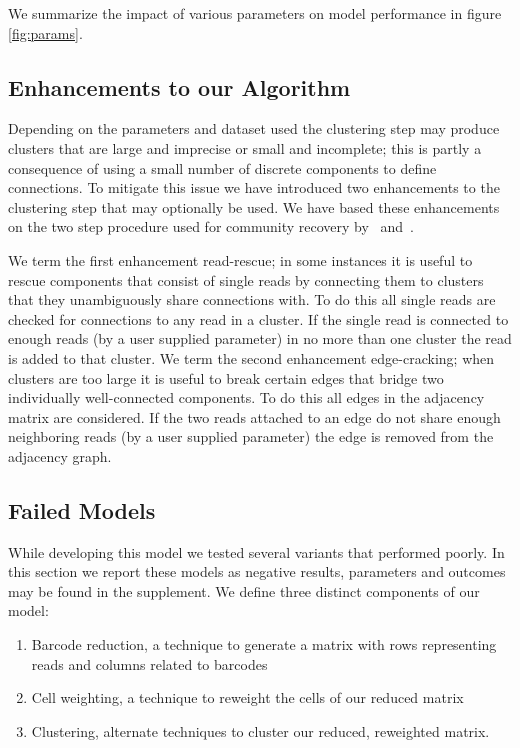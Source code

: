 We summarize the impact of various parameters on model performance in figure \ref{fig:params}.

\subsection{Enhancements to our Algorithm}

Depending on the parameters and dataset used the clustering step may produce clusters that are large and imprecise or small and incomplete; this is partly a consequence of using a small number of discrete components to define connections. To mitigate this issue we have introduced two enhancements to the clustering step that may optionally be used. We have based these enhancements on the two step procedure used for community recovery by~\cite{Abbe2016} and~\cite{Mossel2014}.

We term the first enhancement read-rescue; in some instances it is useful to rescue components that consist of single reads by connecting them to clusters that they unambiguously share connections with. To do this all single reads are checked for connections to any read in a cluster. If the single read is connected to enough reads (by a user supplied parameter) in no more than one cluster the read is added to that cluster. We term the second enhancement edge-cracking; when clusters are too large it is useful to break certain edges that bridge two individually well-connected components. To do this all edges in the adjacency matrix are considered. If the two reads attached to an edge do not share enough neighboring reads (by a user supplied parameter) the edge is removed from the adjacency graph. 

\subsection{Failed Models}
\label{sec:failed}
While developing this model we tested several variants that performed poorly. In this section we report these models as negative results, parameters and outcomes may be found in the supplement. We define three distinct components of our model: 

\begin{enumerate}
\item Barcode reduction, a technique to generate a matrix with rows representing reads and columns related to barcodes
\item Cell weighting, a technique to reweight the cells of our reduced matrix
\item Clustering, alternate techniques to cluster our reduced, reweighted matrix.
\end{enumerate}

